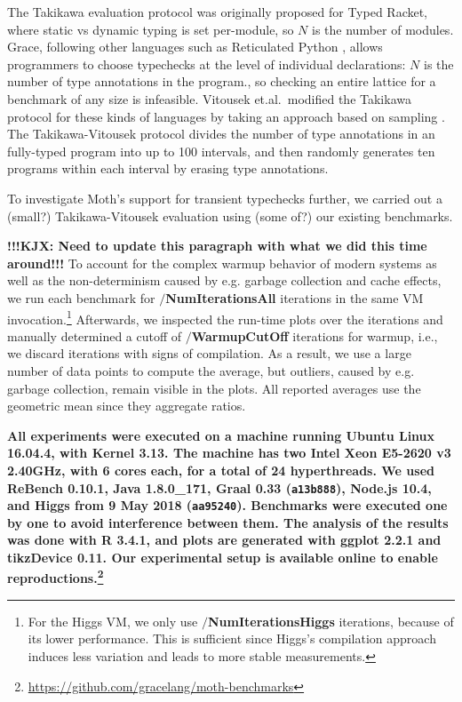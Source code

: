 \documentclass[sigplan,10pt,review,screen]{acmart}\settopmatter{printfolios=true}
\newcommand{\code}[1]{\texttt{#1}}
\newcommand{\ie}{i.e.\xspace}
\newcommand{\eg}{e.g.\xspace}
\begin{document}
The Takikawa evaluation protocol was originally proposed for Typed
Racket, where static vs dynamic typing is set per-module, so $N$ is
the number of modules. Grace, following other languages such as
Reticulated Python \cite{reticPython2014,monotonic2015,Vitousek2017},
allows programmers to choose typechecks at the level of individual
declarations: $N$ is the number of type annotations in the program.,
so checking an entire lattice for a benchmark of any size
is infeasible.  Vitousek et.al.\ modified the Takikawa protocol for
these kinds of languages by taking an approach based on sampling
\cite{vitousek-transient-arXive-2019}.  The Takikawa-Vitousek protocol
divides the number of type annotations in an fully-typed program into
up to 100 intervals, and then randomly generates ten programs within
each interval by erasing type annotations.

To investigate Moth's support for transient typechecks further, we
carried out a (small?) Takikawa-Vitousek evaluation using (some of?)
our existing benchmarks.

\textbf{!!!KJX: Need to update this paragraph with what we did this time around!!!}
To account for the complex warmup behavior
of modern systems\citep{Barrett:2017:VMW} as well as
the non-determinism caused by \eg garbage collection and cache effects,
we run each benchmark for \textbf{$/$NumIterationsAll} iterations in the same
VM invocation.\footnote{
For the Higgs VM, we only use \textbf{$/$NumIterationsHiggs} iterations,
because of its lower performance.
This is sufficient since Higgs's compilation approach induces less variation
and leads to more stable measurements.}
Afterwards, we inspected the run-time plots over the iterations
and manually determined a cutoff of \textbf{$/$WarmupCutOff} iterations for warmup,
\ie, we discard iterations with signs of compilation.
As a result, we use a large number of data points to compute the average,
but outliers, caused by \eg garbage collection, remain visible in the plots.
All reported averages use the geometric mean since they aggregate
ratios.


\textbf{
%
All experiments were executed on a machine running Ubuntu Linux 16.04.4,
with Kernel 3.13.
The machine has two Intel Xeon E5-2620 v3 2.40GHz,
with 6 cores each, for a total of 24 hyperthreads.
We used ReBench 0.10.1\citep{ReBench:2018}, Java 1.8.0\_171, Graal 0.33 (\code{a13b888}),
Node.js 10.4, and Higgs from 9 May 2018 (\code{aa95240}).
Benchmarks were executed one by one to avoid interference between them.
The analysis of the results was done with R 3.4.1,
and plots are generated with ggplot 2.2.1 and tikzDevice 0.11.
Our experimental setup is available online to enable reproductions.\footnote{
\url{https://github.com/gracelang/moth-benchmarks}}
}
\end{document}

